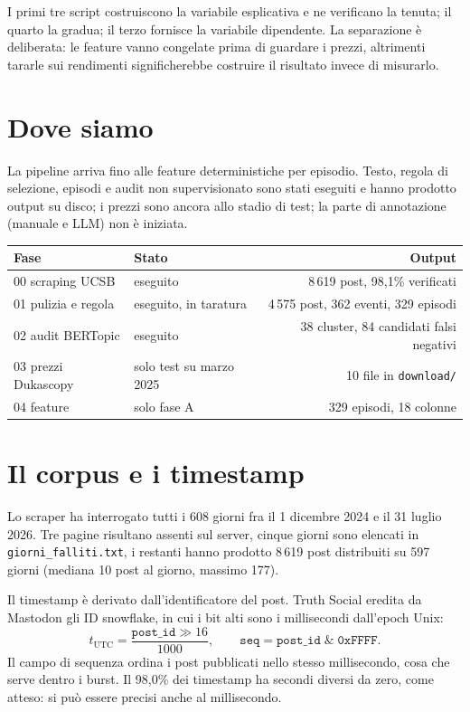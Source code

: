 \documentclass[11pt,a4paper]{article}
\begin{document}
I primi tre script costruiscono la variabile esplicativa e ne verificano la
tenuta; il quarto la gradua; il terzo fornisce la variabile dipendente. La
separazione è deliberata: le feature vanno congelate prima di guardare i
prezzi, altrimenti tararle sui rendimenti significherebbe costruire il
risultato invece di misurarlo.

\section{Dove siamo}

La pipeline arriva fino alle feature deterministiche per episodio. Testo,
regola di selezione, episodi e audit non supervisionato sono stati eseguiti e
hanno prodotto output su disco; i prezzi sono ancora allo stadio di test; la
parte di annotazione (manuale e LLM) non è iniziata.

\begin{center}
\begin{tabular}{llr}
\toprule
Fase & Stato & Output \\
\midrule
00 scraping UCSB        & eseguito & 8\,619 post, 98,1\% verificati \\
01 pulizia e regola     & eseguito, in taratura & 4\,575 post, 362 eventi, 329 episodi \\
02 audit BERTopic       & eseguito & 38 cluster, 84 candidati falsi negativi \\
03 prezzi Dukascopy     & solo test su marzo 2025 & 10 file in \texttt{download/} \\
04 feature              & solo fase A & 329 episodi, 18 colonne \\
\bottomrule
\end{tabular}
\end{center}

\section{Il corpus e i timestamp}

Lo scraper ha interrogato tutti i 608 giorni fra il 1 dicembre 2024 e il 31
luglio 2026. Tre pagine risultano assenti sul server, cinque giorni sono
elencati in \texttt{giorni\_falliti.txt}, i restanti hanno prodotto
8\,619 post distribuiti su 597 giorni (mediana 10 post al giorno, massimo
177).

Il timestamp è derivato dall'identificatore del post. Truth Social eredita da
Mastodon gli ID snowflake, in cui i bit alti sono i millisecondi dall'epoch
Unix:
\[
  t_{\text{UTC}} = \frac{\texttt{post\_id} \gg 16}{1000},
  \qquad
  \texttt{seq} = \texttt{post\_id} \;\&\; \texttt{0xFFFF}.
\]
Il campo di sequenza ordina i post pubblicati nello stesso millisecondo, cosa
che serve dentro i burst. Il 98,0\% dei timestamp ha secondi diversi da zero,
come atteso: si può essere precisi anche al millisecondo.
\end{document}
